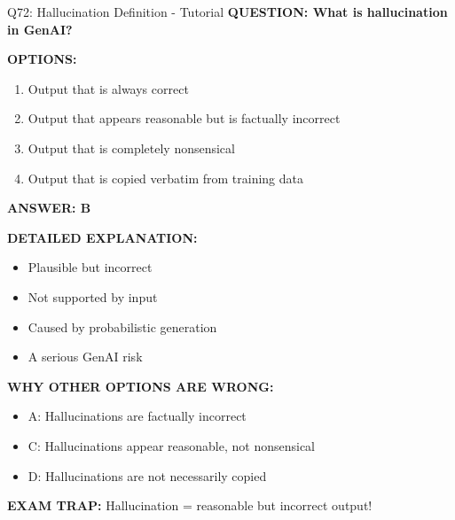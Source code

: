 \documentclass[8pt]{beamer}
\begin{document}
	\begin{frame}{Q72: Hallucination Definition - Tutorial}
		\fontsize{6.5}{7.5}\selectfont
		\textbf{QUESTION: What is hallucination in GenAI?}
		
		\vspace{0.1cm}
		\textbf{OPTIONS:}
		\begin{enumerate}
			\item Output that is always correct
			\item Output that appears reasonable but is factually incorrect
			\item Output that is completely nonsensical
			\item Output that is copied verbatim from training data
		\end{enumerate}
		
		\vspace{0.1cm}
		\textcolor{myblue}{\textbf{ANSWER: B}}
		
		\vspace{0.1cm}
		\textbf{DETAILED EXPLANATION:}
		\begin{itemize}
			\item Plausible but incorrect
			\item Not supported by input
			\item Caused by probabilistic generation
			\item A serious GenAI risk
		\end{itemize}
		
		\vspace{0.1cm}
		\textcolor{myred}{\textbf{WHY OTHER OPTIONS ARE WRONG:}}
		\begin{itemize}
			\item \textcolor{myred}{A:} Hallucinations are factually incorrect
			\item \textcolor{myred}{C:} Hallucinations appear reasonable, not nonsensical
			\item \textcolor{myred}{D:} Hallucinations are not necessarily copied
		\end{itemize}
		
		\textcolor{myred}{\textbf{EXAM TRAP:}} Hallucination = \textcolor{myblue}{reasonable but incorrect} output!
	\end{frame}
	
\end{document}

